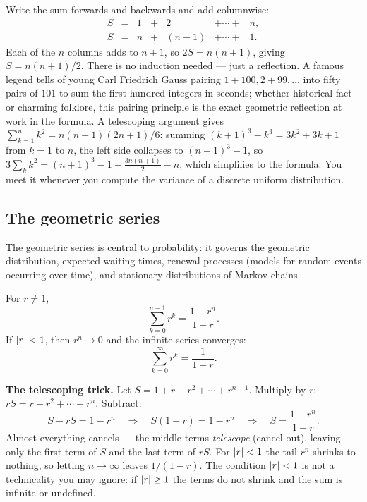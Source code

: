 \begin{whybox}
Write the sum forwards and backwards and add columnwise:
\[
\begin{array}{ccccccc}
S &=& 1 &+& 2 &+ \cdots +& n,\\
S &=& n &+& (n-1) &+ \cdots +& 1.
\end{array}
\]
Each of the $n$ columns adds to $n+1$, so $2S = n(n+1)$, giving $S =
n(n+1)/2$. There is no induction needed --- just a
reflection. A famous legend tells of young Carl Friedrich Gauss pairing $1{+}100,
2{+}99, \dots$ into fifty pairs of $101$ to sum the first hundred integers in
seconds; whether historical fact or charming folklore, this pairing principle is
the exact geometric reflection at work in the formula. A telescoping
argument gives $\sum_{k=1}^n k^2 = n(n+1)(2n+1)/6$: summing $(k+1)^3 - k^3 = 3k^2 + 3k + 1$
from $k = 1$ to $n$, the left side collapses to $(n+1)^3 - 1$, so
$3\sum_k k^2 = (n+1)^3 - 1 - \tfrac{3n(n+1)}{2} - n$, which simplifies to the formula. You meet it whenever you
compute the variance of a discrete uniform distribution.
\end{whybox}

\subsection{The geometric series}
\label{ch39:geom-series}

The geometric series is central to probability: it governs the geometric distribution,
expected waiting times, renewal processes (models for random events occurring over time), and stationary distributions of Markov chains.

\begin{proposition}
\label{ch39:geom}
For $r \neq 1$,
\[
  \sum_{k=0}^{n-1} r^k = \frac{1 - r^n}{1 - r}.
\]
If $\lvert r\rvert < 1$, then $r^n \to 0$ and the infinite series converges:
\[
  \sum_{k=0}^{\infty} r^k = \frac{1}{1 - r}.
\]
\end{proposition}

\begin{whybox}
\textbf{The telescoping trick.} Let $S = 1 + r + r^2 + \cdots + r^{n-1}$.
Multiply by $r$: $rS = r + r^2 + \cdots + r^n$. Subtract:
\[
  S - rS = 1 - r^n \quad\Longrightarrow\quad S(1-r) = 1 - r^n
  \quad\Longrightarrow\quad S = \frac{1-r^n}{1-r}.
\]
Almost everything cancels --- the middle terms \emph{telescope} (cancel out), leaving only
the first term of $S$ and the last term of $rS$. For $\lvert r\rvert<1$ the tail
$r^n$ shrinks to nothing, so letting $n \to \infty$ leaves $1/(1-r)$. The
condition $\lvert r\rvert<1$ is not a technicality you may ignore: if $\lvert r\rvert\ge 1$
the terms do not shrink and the sum is infinite or undefined.
\end{whybox}

